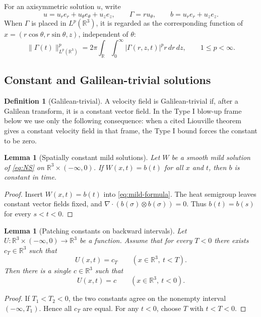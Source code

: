 \documentclass[11pt]{amsart}
\theoremstyle{plain}
\newtheorem{lemma}[theorem]{Lemma}
\theoremstyle{definition}
\newtheorem{definition}[theorem]{Definition}
\theoremstyle{remark}
\numberwithin{equation}{section}
\begin{document}
For an axisymmetric solution \(u\), write
\[
   u=u_re_r+u_\theta e_\theta+u_ze_z,\qquad
   \Gamma=ru_\theta,\qquad
   b=u_re_r+u_ze_z .
\]
When \(\Gamma\) is placed in \(L^p(\mathbb R^3)\), it is regarded as the
corresponding function of \(x=(r\cos\theta,r\sin\theta,z)\), independent of
\(\theta\):
\[
   \|\Gamma(t)\|_{L^p(\mathbb R^3)}^p
   =
   2\pi\int_{\mathbb R}\int_0^\infty
      |\Gamma(r,z,t)|^p r\,dr\,dz,\qquad 1\le p<\infty .
\]

\subsection{Constant and Galilean-trivial solutions}

\begin{definition}[Galilean-trivial]
A velocity field is Galilean-trivial if, after a Galilean transform, it is a
constant vector field.  In the Type I blow-up frame below we use only the
following consequence: when a cited Liouville theorem gives a constant
velocity field in that frame, the Type I bound forces the constant to be zero.
\end{definition}

\begin{lemma}[Spatially constant mild solutions]\label{lem:spatial-constant-mild}
Let \(W\) be a smooth mild solution of \eqref{eq:NS} on
\(\mathbb R^3\times(-\infty,0)\).  If \(W(x,t)=b(t)\) for all \(x\) and \(t\),
then \(b\) is constant in time.
\end{lemma}

\begin{proof}
Insert \(W(x,t)=b(t)\) into \eqref{eq:mild-formula}.  The heat semigroup
leaves constant vector fields fixed, and
\(\nabla\cdot(b(\sigma)\otimes b(\sigma))=0\).  Thus
\(b(t)=b(s)\) for every \(s<t<0\).
\end{proof}

\begin{lemma}[Patching constants on backward intervals]
\label{lem:patch-constants}
Let \(U:\mathbb R^3\times(-\infty,0)\to\mathbb R^3\) be a function.  Assume
that for every \(T<0\) there exists \(c_T\in\mathbb R^3\) such that
\[
   U(x,t)=c_T\qquad(x\in\mathbb R^3,\ t<T).
\]
Then there is a single \(c\in\mathbb R^3\) such that
\[
   U(x,t)=c\qquad(x\in\mathbb R^3,\ t<0).
\]
\end{lemma}

\begin{proof}
If \(T_1<T_2<0\), the two constants agree on the nonempty interval
\((-\infty,T_1)\).  Hence all \(c_T\) are equal.  For any \(t<0\), choose
\(T\) with \(t<T<0\).
\end{proof}
\end{document}
